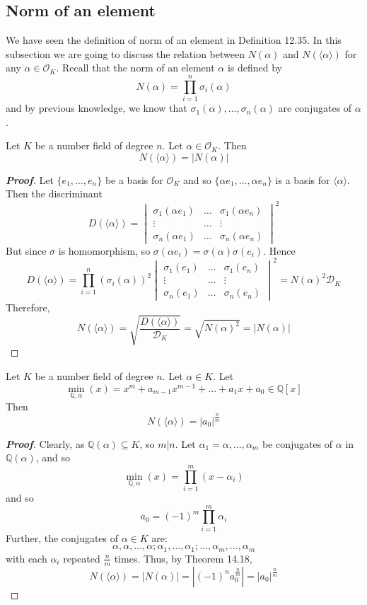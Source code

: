 \subsection{Norm of an element}
We have seen the definition of norm of an element in Definition 12.35. In this subsection we are going to discuss the relation between $N(\alpha)$ and $N(\langle \alpha \rangle)$ for any $\alpha \in \mathcal{O}_K$.
Recall that the norm of an element $\alpha$ is defined by
$$N(\alpha)=\prod_{i=1}^n \sigma_i(\alpha)$$
and by previous knowledge, we know that $\sigma_1(\alpha),\ldots,\sigma_n(\alpha)$ are conjugates of $\alpha$.
\begin{theorem} Let $K$ be a number field of degree $n$. Let $\alpha \in \mathcal{O}_K$. Then
$$N(\langle \alpha \rangle)=|N(\alpha)|$$
\end{theorem}
\begin{proof}[\bf Proof] Let $\{e_1,\ldots,e_n\}$ be a basis for $\mathcal{O}_K$ and so $\{\alpha e_1,\ldots,\alpha e_n\}$ is a basis for $\langle \alpha \rangle$. Then the discriminant
\begin{equation*} D(\langle \alpha \rangle)= \begin{vmatrix} \sigma_1(\alpha e_1) &\ldots& \sigma_1(\alpha e_n)\\
\vdots &\ldots& \vdots\\
\sigma_n(\alpha e_1)&\ldots &\sigma_n(\alpha e_n) \end{vmatrix}^2
\end{equation*}
But since $\sigma$ is homomorphism, so $\sigma(\alpha e_i)=\sigma(\alpha) \sigma(e_i)$. Hence
\begin{equation*} D(\langle \alpha \rangle)= \prod_{i=1}^n (\sigma_i(\alpha))^2 \begin{vmatrix} \sigma_1(e_1) &\ldots& \sigma_1(e_n)\\
\vdots &\ldots& \vdots\\
\sigma_n(e_1)&\ldots& \sigma_n(e_n) \end{vmatrix}^2=N(\alpha)^2 \mathcal{D}_K
\end{equation*}
Therefore,
$$N(\langle \alpha \rangle)=\sqrt{\frac{D(\langle \alpha \rangle)}{\mathcal{D}_K}}=\sqrt{N(\alpha)^2}
=|N(\alpha)|$$
\end{proof}
\begin{theorem} Let $K$ be a number field of degree $n$. Let $\alpha \in K$. Let
$$\min_{\mathbb{Q},\alpha}(x)=x^m+a_{m-1}x^{m-1}+\ldots+a_1x+a_0 \in \mathbb{Q}[x]$$
Then
$$N(\langle \alpha \rangle)=|a_0|^{\frac{n}{m}}$$
\end{theorem}
\begin{proof}[\bf Proof] Clearly, as $\mathbb{Q}(\alpha) \subseteq K$, so $m|n$. Let $\alpha_1=\alpha,\ldots,\alpha_m$ be conjugates of $\alpha$ in $\mathbb{Q}(\alpha)$, and so
$$\min_{\mathbb{Q},\alpha}(x)=\prod_{i=1}^m (x-\alpha_i)$$
and so
$$a_0=(-1)^m \prod_{i=1}^m \alpha_i$$
Further, the conjugates of $\alpha \in K$ are:
$$\alpha,\alpha,\ldots,\alpha;\alpha_1,\ldots,\alpha_1;\ldots,\alpha_m,\ldots,\alpha_m$$
with each $\alpha_i$ repeated $\frac{n}{m}$ times.
Thus, by Theorem 14.18,
$$N(\langle \alpha \rangle)=|N(\alpha)|=|(-1)^n a^{\frac{n}{m}}_0|=|a_0|^{\frac{n}{m}}$$
\end{proof}
